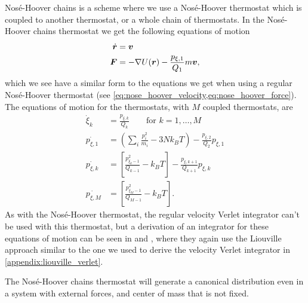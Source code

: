 Nosé-Hoover chains is a scheme where we use a Nosé-Hoover thermostat which is coupled to another thermostat, or a whole chain of thermostats. In the Nosé-Hoover chains thermostat\cite{martyna1992nose} we get the following equations of motion
\begin{align*}
    \dot{\boldsymbol{r}} &= \boldsymbol{v} \\
    \boldsymbol{F} &= -\nabla U(\boldsymbol{r}) - \frac{p_{\xi,1}}{Q_1}m\boldsymbol{v},
\end{align*}
which we see have a similar form to the equations we get when using a regular Nosé-Hoover thermostat (see \cref{eq:nose_hoover_velocity,eq:nose_hoover_force}). The equations of motion for the thermostats, with $M$ coupled thermostats, are
\begin{align*}
    \dot \xi_k &= \frac{p_{\xi,k}}{Q_k} \qquad\text{for } k = 1,\dots,M \\
    \dot{p_{\xi,1}} &= \left( \sum_i \frac{p_i^2}{m_i} - 3Nk_BT \right) - \frac{p_{\xi,2}}{Q_2} p_{\xi,1} \\
    \dot{p_{\xi,k}} &= \left[ \frac{p_{\xi_k-1}^2}{Q_{k-1}} - k_BT \right] - \frac{p_{\xi,k+1}}{Q_{k+1}}p_{\xi,k} \\
    \dot{p_{\xi,M}} &= \left[ \frac{p_{\xi_M-1}^2}{Q_{M-1}} - k_BT \right].
\end{align*}
As with the Nosé-Hoover thermostat, the regular velocity Verlet integrator can't be used with this thermostat, but a derivation of an integrator for these equations of motion can be seen in \cite[Appendix E.2.1]{frenkel2001understanding} and \cite{martyna1996explicit}, where they again use the Liouville approach similar to the one we used to derive the velocity Verlet integrator in \cref{appendix:liouville_verlet}.

The Nosé-Hoover chains thermostat will generate a canonical distribution even in a system with external forces, and center of mass that is not fixed\cite[Appendix B.2.2]{frenkel2001understanding}.


